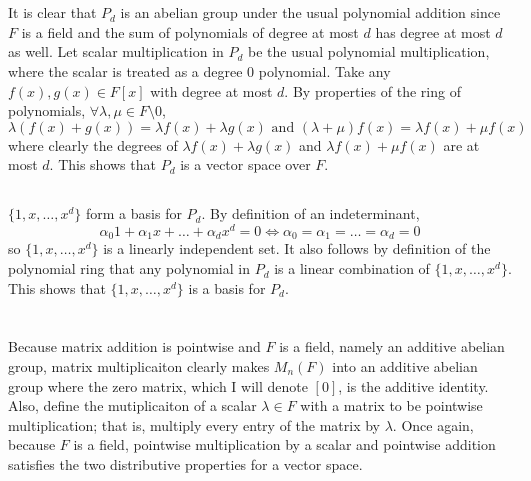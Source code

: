 \documentclass[12pt]{article}
\begin{document}
\section{}
\subsection{}
It is clear that $P_d$ is an abelian group under the usual polynomial addition since $F$ is a field and the sum of polynomials of degree at most $d$ has degree at most $d$ as well. 
Let scalar multiplication in $P_d$ be the usual polynomial multiplication, where the scalar is treated as a degree 0 polynomial. 
Take any $f(x), g(x) \in F[x]$ with degree at most $d$.
By properties of the ring of polynomials, $\forall \lambda, \mu \in F \setminus 0$,  
$$\lambda(f(x) + g(x)) = \lambda f(x) + \lambda g(x) \text{ and } (\lambda + \mu)f(x) = \lambda f(x) + \mu f(x)$$ 
where clearly the degrees of $\lambda f(x) + \lambda g(x)$ and $\lambda f(x) + \mu f(x)$ are at most $d$. 
This shows that $P_d$ is a vector space over $F$. 

\subsection{}
$\{1, x, \ldots, x^d\}$ form a basis for $P_d$. 
By definition of an indeterminant, 
$$\alpha_0 1 + \alpha_1 x + \ldots + \alpha_d x^d = 0 \iff \alpha_0 = \alpha_1 = \ldots = \alpha_d = 0$$
so $\{1, x, \ldots, x^d\}$ is a linearly independent set.   
It also follows by definition of the polynomial ring that any polynomial in $P_d$ is a linear combination of $\{1, x, \ldots, x^d\}$.
This shows that $\{1, x, \ldots, x^d\}$ is a basis for $P_d$. 

\section{} 
\subsection{}
Because matrix addition is pointwise and $F$ is a field, namely an additive abelian group, matrix multiplicaiton clearly makes $M_n(F)$ into an additive abelian group where the zero matrix, which I will denote $[0]$, is the additive identity.  
Also, define the mutiplicaiton of a scalar $\lambda \in F$ with a matrix to be pointwise multiplication;
that is, multiply every entry of the matrix by $\lambda$. 
Once again, because $F$ is a field, pointwise multiplication by a scalar and pointwise addition satisfies the two distributive properties for a vector space. 
\end{document}
